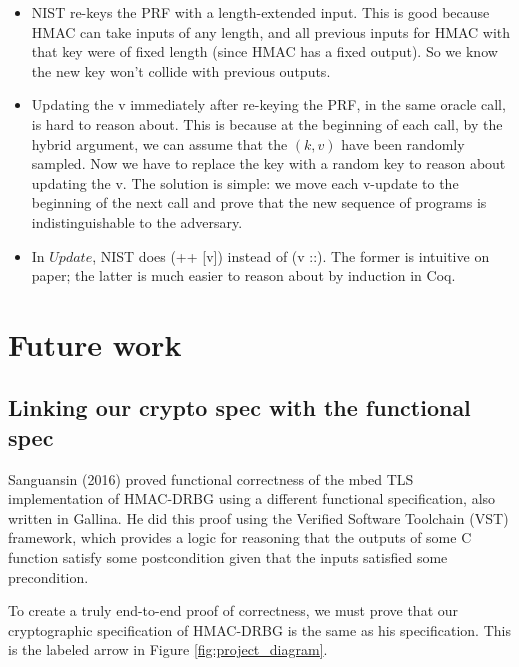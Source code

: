 \documentclass[12pt,lot, lof]{puthesis}
\newcommand{\kv} {$(k, v)$ }
\begin{document}
{\begin{itemize}
\item NIST re-keys the PRF with a length-extended input. This is good because HMAC can take inputs of any length, and all previous inputs for HMAC with that key were of fixed length (since HMAC has a fixed output). So we know the new key won't collide with previous outputs.
\item Updating the v immediately after re-keying the PRF, in the same oracle call, is hard to reason about. This is because at the beginning of each call, by the hybrid argument, we can assume that the \kv have been randomly sampled. Now we have to replace the key with a random key to reason about updating the v. The solution is simple: we move each v-update to the beginning of the next call and prove that the new sequence of programs is indistinguishable to the adversary.
\item In $Update$, NIST does (++ [v]) instead of (v ::). The former is intuitive on paper; the latter is much easier to reason about by induction in Coq.
\end{itemize}

\chapter{Future work} \label{sec:future_work}
\section{Linking our crypto spec with the functional spec} \label{sec:linking_our_crypto_spec_with_the_functional_spec}

Sanguansin (2016) proved functional correctness of the mbed TLS implementation of HMAC-DRBG using a different functional specification, also written in Gallina. He did this proof using the Verified Software Toolchain (VST) framework, which provides a logic for reasoning that the outputs of some C function satisfy some postcondition given that the inputs satisfied some precondition.

To create a truly end-to-end proof of correctness, we must prove that our cryptographic specification of HMAC-DRBG is the same as his specification. This is the labeled arrow in Figure \ref{fig:project_diagram}.

}
\end{document}
